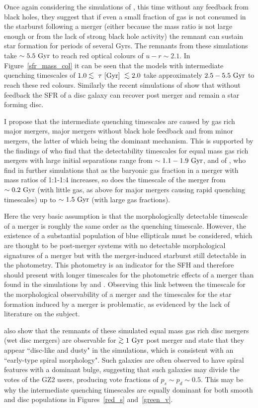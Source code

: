 Once again considering the simulations of \citet{springel05b}, this time without any feedback from black holes, they suggest that if even a small fraction of gas is not consumed in the starburst following a merger (either because the mass ratio is not large enough or from the lack of strong black hole activity) the remnant can sustain star formation for periods of several Gyrs. The remnants from these simulations take $\sim5.5~\rm{Gyr}$ to reach red optical colours of $u-r \sim 2.1$. In Figure~\ref{sfr_mass_col} it can be seen that the models with intermediate quenching timescales of $1.0 \lesssim ~\tau~\rm{[Gyr]} ~\lesssim 2.0$ take approximately $2.5-5.5~\rm{Gyr}$ to reach these red colours. Similarly the recent simulations of \citet{pontzen16} show that without feedback the SFR of a disc galaxy can recover post merger and remain a star forming disc. 

I propose that the intermediate quenching timescales are caused by gas rich major mergers, major mergers without black hole feedback and from minor mergers, the latter of which being the dominant mechanism. This is supported by the findings of \citet{lotz08b} who find that the detectability timescales for equal mass gas rich mergers with large initial separations range from $\sim 1.1-1.9~\rm{Gyr}$, and of \citet{Lotz11}, who find in further simulations that as the baryonic gas fraction in a merger with mass ratios of 1:1-1:4 increases, so does the timescale of the merger from $\sim0.2~\rm{Gyr}$ (with little gas, as above for major mergers causing rapid quenching timescales) up to $\sim1.5~\rm{Gyr}$ (with large gas fractions). 

Here the very basic assumption is that the morphologically detectable timescale of a merger is roughly the same order as the quenching timescale. However, the existence of a substantial population of blue ellipticals \citep{Sch09} must be considered, which are thought to be post-merger systems with no detectable morphological signatures of a merger but with the merger-induced starburst still detectable in the photometry. This photometry is an indicator for the SFH and therefore should present with longer timescales for the photometric effects of a merger than found in the simulations by \citet{lotz08b} and \citet{Lotz11}. Observing this link between the timescale for the morphological observability of a merger and the timescales for the star formation induced by a merger is problematic, as evidenced by the lack of literature on the subject.

\citet{lotz08b} also show that the remnants of these simulated equal mass gas rich disc mergers (wet disc mergers) are observable for $\gtrsim1~\rm{Gyr}$ post merger and state that they appear ``disc-like and dusty" in the simulations, which is consistent with an ``early-type spiral morphology".  Such galaxies are often observed to have spiral features with a dominant bulge, suggesting that such galaxies may divide the votes of the GZ2 users, producing vote fractions of $p_s \sim p_d \sim 0.5$. This may be why the intermediate quenching timescales are equally dominant for both smooth and disc populations in Figures~\ref{red_s} and~\ref{green_v}. 

